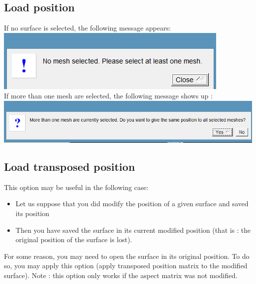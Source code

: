 \subsection{Load position}
If no surface is selected, the following message
appears:\\
\includegraphics[scale=0.5]{images/File/open_position1.png}
\\
If more than one mesh are selected, the following message shows up :\\
\includegraphics[scale=0.5]{images/File/open_position2.png}

\subsection{Load transposed position}
This option may be useful in the following case:
\begin{itemize}
\item Let us suppose that you did modify the position of a given surface and saved its position
\item Then you have saved the surface in its current modified position (that is : the original position of the
surface is lost).
\end{itemize}

For some reason, you may need to open the surface in its original position. To do so, you may apply this option (apply transposed position matrix to the modified surface).
Note : this option only works if the aspect matrix was not modified.

